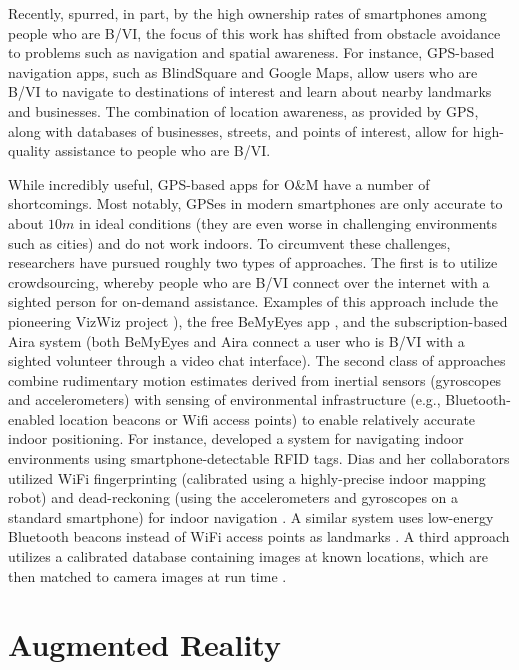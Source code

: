 \documentclass[chi_draft]{sigchi}
\newcommand{\BVI}{B/VI\xspace}
\newcommand{\OM}{O\&M\xspace}
\begin{document}
Recently, spurred, in part, by the high ownership rates of smartphones among people who are \BVI, the focus of this work has shifted from obstacle avoidance to problems such as navigation and spatial awareness.  For instance, GPS-based navigation apps, such as BlindSquare \cite{blindsquare} and Google Maps, allow users who are \BVI to navigate to destinations of interest and learn about nearby landmarks and businesses.  The combination of location awareness, as provided by GPS, along with databases of businesses, streets, and points of interest, allow for high-quality assistance to people who are \BVI.

While incredibly useful, GPS-based apps for \OM have a number of shortcomings.  Most notably, GPSes in modern smartphones are only accurate to about $10m$ in ideal conditions (they are even worse in challenging environments such as cities) and do not work indoors.  To circumvent these challenges, researchers have pursued roughly two types of approaches.  The first is to utilize crowdsourcing, whereby people who are \BVI connect over the internet with a sighted person for on-demand assistance.  Examples of this approach include the pioneering VizWiz project \cite{bigham2010vizwiz}), the free BeMyEyes app \cite{bemyeyesaccessworld}, and the subscription-based Aira system \cite{aira} (both BeMyEyes and Aira connect a user who is \BVI with a sighted volunteer through a video chat interface).  The second class of approaches combine rudimentary motion estimates derived from inertial sensors (gyroscopes and accelerometers) with sensing of environmental infrastructure (e.g., Bluetooth-enabled location beacons or Wifi access points) to enable relatively accurate indoor positioning.  For instance, \cite{ganz2015percept, ganz2011percept, ganz2014percept} developed a system for navigating indoor environments using smartphone-detectable RFID tags.  Dias and her collaborators utilized WiFi fingerprinting (calibrated using a highly-precise indoor mapping robot) and dead-reckoning (using the accelerometers and gyroscopes on a standard smartphone) for indoor navigation \cite{Dias__2014_7778}.  A similar system uses low-energy Bluetooth beacons instead of WiFi access points as landmarks \cite{ishihara2017beacon, ahmetovic2016navcog, ahmetovic2017achieving}.  A third approach utilizes a calibrated database containing images at known locations, which are then matched to camera images at run time \cite{bai2014wearable}.

\section{Augmented Reality}
\end{document}
